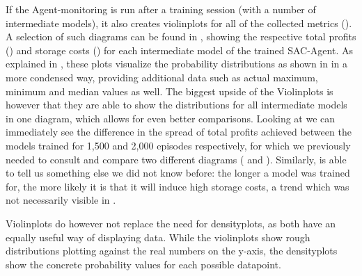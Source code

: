 If the Agent-monitoring is run after a training session (with a number of intermediate models), it also creates violinplots for all of the collected metrics (). A selection of such diagrams can be found in , showing the respective total profits () and storage costs () for each intermediate model of the trained SAC-Agent. As explained in , these plots visualize the probability distributions as shown in  in a more condensed way, providing additional data such as actual maximum, minimum and median values as well. The biggest upside of the Violinplots is however that they are able to show the distributions for all intermediate models in one diagram, which allows for even better comparisons. Looking at  we can immediately see the difference in the spread of total profits achieved between the models trained for 1,500 and 2,000 episodes respectively, for which we previously needed to consult and compare two different diagrams ( and ). Similarly,  is able to tell us something else we did not know before: the longer a model was trained for, the more likely it is that it will induce high storage costs, a trend which was not necessarily visible in .

Violinplots do however not replace the need for densityplots, as both have an equally useful way of displaying data. While the violinplots show rough distributions plotting against the real numbers on the y-axis, the densityplots show the concrete probability values for each possible datapoint.

